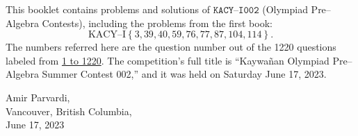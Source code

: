 \documentclass[12pt,a4paper]{memoir}
\theoremstyle{definition}
\begin{document}
		This booklet contains problems and solutions of $\texttt{KACY--I002}$ (Olympiad Pre--Algebra Contests), including the problems from the first book: $$\text{KACY--I}\left\{3,39,40,59,76,77,87,104,114\right\}.$$ The numbers referred here are the question number out of the 1220 questions labeled from \href{https://github.com/parvardi/KACY/blob/main/KACY-VOL-I.pdf}{1 to 1220}. The competition's full title is ``Kaywañan Olympiad Pre--Algebra Summer Contest 002,'' and it was held on Saturday June 17, 2023.
%	
\Large
		\begin{flushright}
			Amir Parvardi,\\
			Vancouver, British Columbia,\\
			June 17, 2023
		\end{flushright}
	
\end{document}

